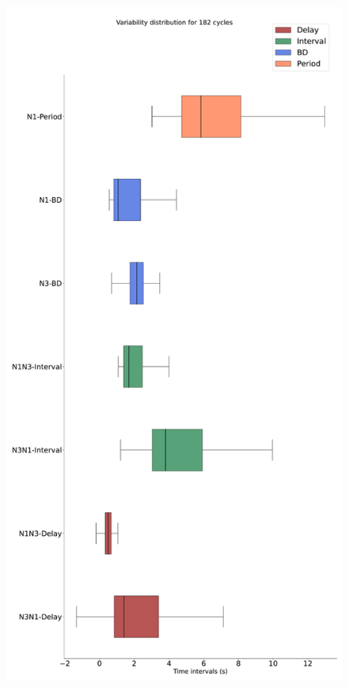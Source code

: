 \begin{figure}[htbp]
\begin{minipage}{0.9\textwidth}
\begin{minipage}[b]{0.45\textwidth}
			\includegraphics[width=\textwidth]{./invariants/data/SUSSEX/prep1/images/spontaneous_2phases_boxplot.pdf}
		\end{minipage}
		\begin{minipage}[b]{0.53\textwidth}

\end{minipage}
\end{minipage}
\end{figure}
